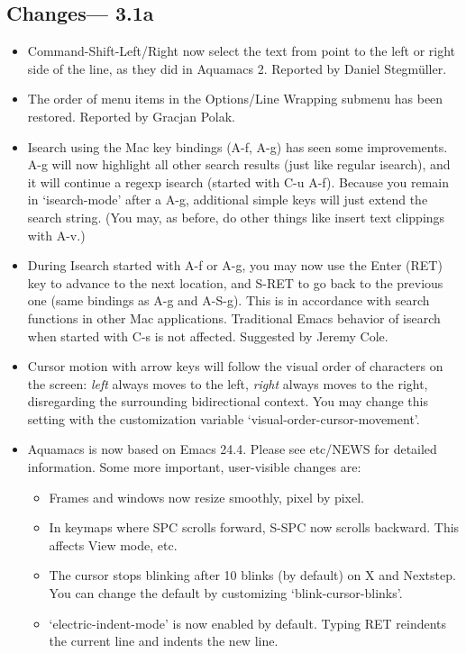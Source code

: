 \subsection{Changes--- 3.1a}
\begin{itemize}
\item Command-Shift-Left/Right now select the text from point to the left or right side of the line, as they did in Aquamacs 2. 
Reported by Daniel Stegm\"uller.
\item The order of menu items in the Options/Line Wrapping submenu has been restored.
Reported by Gracjan Polak.
\item Isearch using the Mac key bindings (A-f, A-g) has seen some improvements.  A-g will now highlight all other search results (just like regular isearch), and it will continue a regexp isearch (started with C-u A-f).  Because you remain in `isearch-mode' after a A-g, additional simple keys will just extend the search string.  (You may, as before, do other things like insert text clippings with A-v.)
\item During Isearch started with A-f or A-g, you may now use the Enter (RET) key to advance to the next location, and S-RET to go back to the previous one (same bindings as A-g and A-S-g).  This is in accordance with search functions in other Mac applications.  Traditional Emacs behavior of isearch when started with C-s is not affected.
Suggested by Jeremy Cole.
\item Cursor motion with arrow keys will follow the
visual order of characters on the screen: \emph{left} always moves to the
left, \emph{right} always moves to the right, disregarding the surrounding
bidirectional context.  You may change this setting with the customization variable `visual-order-cursor-movement'.
\item Aquamacs is now based on Emacs 24.4.  Please see etc/NEWS for detailed information.  Some more important, user-visible changes are:
\begin{itemize}
\item Frames and windows now resize smoothly, pixel by pixel.
\item In keymaps where SPC scrolls forward, S-SPC now scrolls backward.
This affects View mode, etc.
\item The cursor stops blinking after 10 blinks (by default) on X and Nextstep.
You can change the default by customizing `blink-cursor-blinks'.
\item `electric-indent-mode' is now enabled by default.
Typing RET reindents the current line and indents the new line.

\end{itemize}
\end{itemize}
